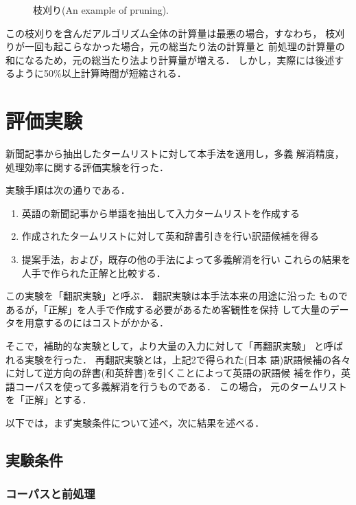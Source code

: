 \begin{figure}
\begin{center}
\end{center}
\caption{枝刈り(An example of pruning).}
\label{FigStree}
\end{figure}

この枝刈りを含んだアルゴリズム全体の計算量は最悪の場合，すなわち，
枝刈りが一回も起こらなかった場合，元の総当たり法の計算量と
前処理の計算量の和になるため，元の総当たり法より計算量が増える．
しかし，実際には後述するように50\%以上計算時間が短縮される．

\section{評価実験}

新聞記事から抽出したタームリストに対して本手法を適用し，多義
解消精度，処理効率に関する評価実験を行った． 

実験手順は次の通りである． 

\begin{enumerate}
\item 英語の新聞記事から単語を抽出して入力タームリストを作成する
\item 作成されたタームリストに対して英和辞書引きを行い訳語候補を得る
\item 提案手法，および，既存の他の手法によって多義解消を行い
これらの結果を人手で作られた正解と比較する． 
\end{enumerate}

この実験を「翻訳実験」と呼ぶ． 翻訳実験は本手法本来の用途に沿った
ものであるが，「正解」を人手で作成する必要があるため客観性を保持
して大量のデータを用意するのにはコストがかかる． 

そこで，補助的な実験として，より大量の入力に対して「再翻訳実験」
と呼ばれる実験を行った． 再翻訳実験とは，上記2で得られた(日本
語)訳語候補の各々に対して逆方向の辞書(和英辞書)を引くことによって英語の訳語候
補を作り，英語コーパスを使って多義解消を行うものである． この場合，
元のタームリストを「正解」とする． 

以下では，まず実験条件について述べ，次に結果を述べる． 

\subsection{実験条件}

\subsubsection{コーパスと前処理}

